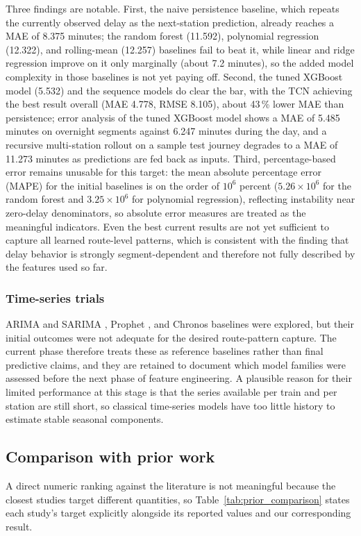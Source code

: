 \documentclass[a4paper,fleqn]{cas-dc}
\begin{document}
Three findings are notable. First, the naive persistence baseline, which
repeats the currently observed delay as the next-station prediction, already
reaches a MAE of 8.375 minutes; the random forest (11.592), polynomial
regression (12.322), and rolling-mean (12.257) baselines fail to beat it,
while linear and ridge regression improve on it only marginally (about
7.2 minutes), so the added model complexity in those baselines is not yet
paying off. Second, the tuned XGBoost model (5.532) and the sequence models do
clear the bar, with the TCN achieving the best result overall (MAE 4.778,
RMSE 8.105), about 43\,\% lower MAE than persistence; error analysis of the
tuned XGBoost model shows a MAE of 5.485 minutes on overnight segments against
6.247 minutes during the day, and a recursive multi-station rollout on a
sample test journey degrades to a MAE of 11.273 minutes as predictions are fed
back as inputs. Third, percentage-based error remains unusable for this
target: the mean absolute percentage error (MAPE) for the initial baselines is
on the order of $10^{6}$ percent ($5.26\times10^{6}$ for the random forest and
$3.25\times10^{6}$ for polynomial regression), reflecting instability near
zero-delay denominators, so absolute error measures are treated as the
meaningful indicators. Even the best current results are not yet sufficient to
capture all learned route-level patterns, which is consistent with the finding
that delay behavior is strongly segment-dependent and therefore not fully
described by the features used so far.

\subsubsection{Time-series trials}
ARIMA and SARIMA \citep{boxjenkins1976}, Prophet \citep{taylor2018forecasting},
and Chronos \citep{ansari2024chronos} baselines were explored, but their initial
outcomes were not adequate for the desired route-pattern capture. The current
phase therefore treats these as reference baselines rather than final
predictive claims, and they are retained to document which model families were
assessed before the next phase of feature engineering. A plausible reason for
their limited performance at this stage is that the series available per train
and per station are still short, so classical time-series models have too
little history to estimate stable seasonal components.

\subsection{Comparison with prior work}
A direct numeric ranking against the literature is not meaningful because the
closest studies target different quantities, so Table~\ref{tab:prior_comparison}
states each study's target explicitly alongside its reported values and our
corresponding result.
\end{document}
